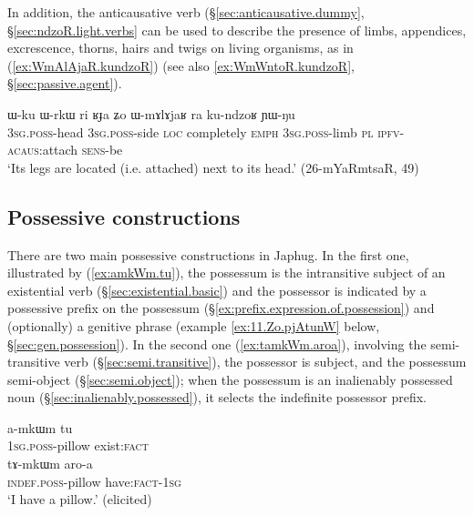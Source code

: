 In addition, the anticausative  verb  (§\ref{sec:anticausative.dummy}, §\ref{sec:ndzoR.light.verbs} can be used to describe the presence of limbs, appendices, excrescence, thorns, hairs and twigs on living organisms, as in (\ref{ex:WmAlAjaR.kundzoR}) (see also \ref{ex:WmWntoR.kundzoR}, §\ref{sec:passive.agent}).

\begin{exe}
\ex \label{ex:WmAlAjaR.kundzoR}
\gll ɯ-ku ɯ-rkɯ ri ʁɟa ʑo ɯ-mɤlɤjaʁ ra ku-ndzoʁ ɲɯ-ŋu \\
\textsc{3sg}.\textsc{poss}-head \textsc{3sg}.\textsc{poss}-side \textsc{loc} completely \textsc{emph} \textsc{3sg}.\textsc{poss}-limb \textsc{pl} \textsc{ipfv}-\textsc{acaus}:attach \textsc{sens}-be \\
\glt `Its legs are located (i.e. attached) next to its head.' (26-mYaRmtsaR, 49)
\end{exe}

\subsection{Possessive constructions} \label{sec:possessive.constructions}
There are two main possessive constructions in Japhug. In the first one, illustrated by (\ref{ex:amkWm.tu}), the possessum is the intransitive subject of an existential verb (§\ref{sec:existential.basic}) and the possessor is indicated by a possessive prefix on the possessum (§\ref{ex:prefix.expression.of.possession}) and (optionally) a genitive phrase (example \ref{ex:11.Zo.pjAtunW} below, §\ref{sec:gen.possession}). In the second one (\ref{ex:tamkWm.aroa}), involving the semi-transitive verb   (§\ref{sec:semi.transitive}), the possessor is subject, and the possessum semi-object (§\ref{sec:semi.object}); when the possessum is an inalienably possessed noun (§\ref{sec:inalienably.possessed}), it selects the indefinite possessor prefix. 

\begin{exe}
\ex \label{ex:have.pillow}
\begin{xlist}
\ex \label{ex:amkWm.tu}
\gll a-mkɯm tu \\
\textsc{1sg}.\textsc{poss}-pillow exist:\textsc{fact} \\
\ex \label{ex:tamkWm.aroa}
\gll tɤ-mkɯm aro-a \\
\textsc{indef}.\textsc{poss}-pillow have:\textsc{fact}-\textsc{1sg} \\
\glt `I have a pillow.' (elicited)
\end{xlist}
\end{exe}
 
